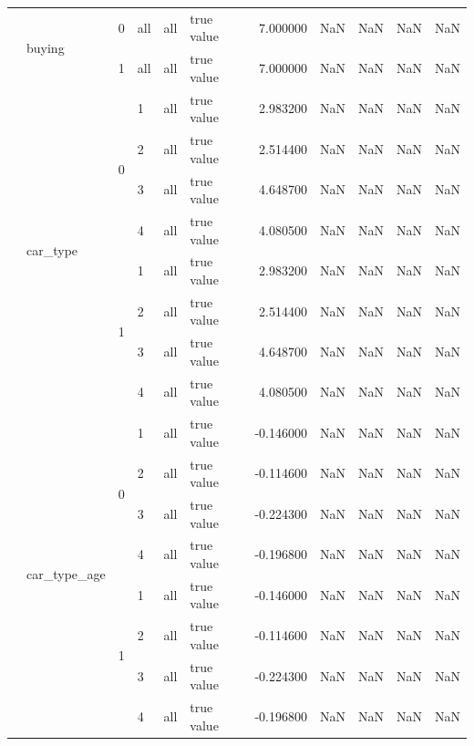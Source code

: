 \begin{tabular}{llllllrrrrr}
 & \multirow[t]{2}{*}{buying} & 0 & all & all & true value & 7.000000 & NaN & NaN & NaN & NaN \\
\cline{3-11} \cline{4-11} \cline{5-11}
 &  & 1 & all & all & true value & 7.000000 & NaN & NaN & NaN & NaN \\
\cline{2-11} \cline{3-11} \cline{4-11} \cline{5-11}
 & \multirow[t]{8}{*}{car_type} & \multirow[t]{4}{*}{0} & 1 & all & true value & 2.983200 & NaN & NaN & NaN & NaN \\
\cline{4-11} \cline{5-11}
 &  &  & 2 & all & true value & 2.514400 & NaN & NaN & NaN & NaN \\
\cline{4-11} \cline{5-11}
 &  &  & 3 & all & true value & 4.648700 & NaN & NaN & NaN & NaN \\
\cline{4-11} \cline{5-11}
 &  &  & 4 & all & true value & 4.080500 & NaN & NaN & NaN & NaN \\
\cline{3-11} \cline{4-11} \cline{5-11}
 &  & \multirow[t]{4}{*}{1} & 1 & all & true value & 2.983200 & NaN & NaN & NaN & NaN \\
\cline{4-11} \cline{5-11}
 &  &  & 2 & all & true value & 2.514400 & NaN & NaN & NaN & NaN \\
\cline{4-11} \cline{5-11}
 &  &  & 3 & all & true value & 4.648700 & NaN & NaN & NaN & NaN \\
\cline{4-11} \cline{5-11}
 &  &  & 4 & all & true value & 4.080500 & NaN & NaN & NaN & NaN \\
\cline{2-11} \cline{3-11} \cline{4-11} \cline{5-11}
 & \multirow[t]{8}{*}{car_type_age} & \multirow[t]{4}{*}{0} & 1 & all & true value & -0.146000 & NaN & NaN & NaN & NaN \\
\cline{4-11} \cline{5-11}
 &  &  & 2 & all & true value & -0.114600 & NaN & NaN & NaN & NaN \\
\cline{4-11} \cline{5-11}
 &  &  & 3 & all & true value & -0.224300 & NaN & NaN & NaN & NaN \\
\cline{4-11} \cline{5-11}
 &  &  & 4 & all & true value & -0.196800 & NaN & NaN & NaN & NaN \\
\cline{3-11} \cline{4-11} \cline{5-11}
 &  & \multirow[t]{4}{*}{1} & 1 & all & true value & -0.146000 & NaN & NaN & NaN & NaN \\
\cline{4-11} \cline{5-11}
 &  &  & 2 & all & true value & -0.114600 & NaN & NaN & NaN & NaN \\
\cline{4-11} \cline{5-11}
 &  &  & 3 & all & true value & -0.224300 & NaN & NaN & NaN & NaN \\
\cline{4-11} \cline{5-11}
 &  &  & 4 & all & true value & -0.196800 & NaN & NaN & NaN & NaN \\

\end{tabular}
